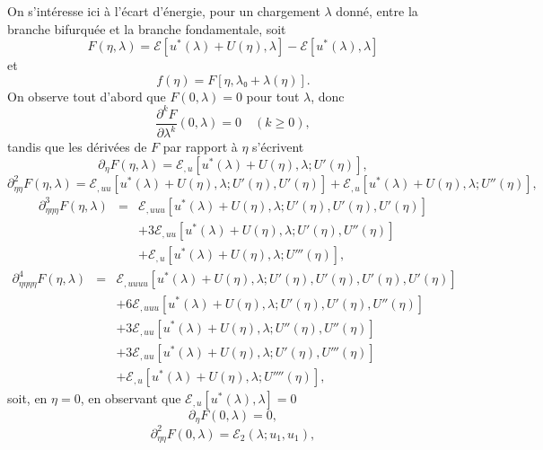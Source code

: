 \documentclass{article}
\begin{document}
On s'intéresse ici à l'écart d'énergie, pour un chargement
$λ$ donné, entre la branche bifurquée et la branche
fondamentale, soit
\begin{equation} F (η, λ) =ℰ [u^{\ast} (λ) + U (η), λ]
   -ℰ [u^{\ast} (λ), λ] \end{equation}
et
\begin{equation} f (η) = F [η, λ₀ + λ (η)] . \end{equation}
On observe tout d'abord que $F (0, λ) = 0$ pour tout $λ$, donc
\begin{equation} \frac{\partial^k F}{\partial λ^k} (0, λ) = 0 \quad (k \geq 0),
\end{equation}
tandis que les dérivées de $F$ par rapport à $η$ s'écrivent
\begin{equation} \partial_{η} F (η, λ) =ℰ_{, u} [u^{\ast} (λ) +
   U (η), λ ; U' (η)], \end{equation}
\begin{equation} \partial_{η  η}^2 F (η, λ) =ℰ_{, u
    u} [u^{\ast} (λ) + U (η), λ ; U' (η), U' (η)]
   +ℰ_{, u} [u^{\ast} (λ) + U (η), λ ; U'' (η)],
\end{equation}
\begin{eqnarray*}
  \partial_{η  η  η}^3 F (η, λ) & = &
  ℰ_{, u  u  u} [u^{\ast} (λ) + U (η),
  λ ; U' (η), U' (η), U' (η)]\\
  &  &    + 3ℰ_{, u  u}
  [u^{\ast} (λ) + U (η), λ ; U' (η), U'' (η)]\\
  &  &    +ℰ_{, u} [u^{\ast} (λ) +
  U (η), λ ; U''' (η)],
\end{eqnarray*}
\begin{eqnarray}
  \partial_{η  η  η  η}^4 F (η,
  λ) & = & ℰ_{, u  u  u  u} [u^{\ast}
  (λ) + U (η), λ ; U' (η), U' (η), U' (η), U' (η)]
  \nonumber\\
  &  &  + 6ℰ_{, u  u  u} [u^{\ast}
  (λ) + U (η), λ ; U' (η), U' (η), U'' (η)]
  \nonumber\\
  &  &  + 3ℰ_{, u  u} [u^{\ast} (λ) + U
  (η), λ ; U'' (η), U'' (η)] \nonumber\\
  &  &  + 3ℰ_{, u  u} [u^{\ast} (λ) + U
  (η), λ ; U' (η), U''' (η)] \nonumber\\
  &  &  +ℰ_{, u} [u^{\ast} (λ) + U (η), λ ;
  U'''' (η)], \nonumber
\end{eqnarray}
soit, en $η = 0$, en observant que $ℰ_{, u} [u^{\ast} (λ),
λ] = 0$
\begin{equation} \partial_{η} F (0, λ) = 0, \end{equation}
\begin{equation} \partial_{η  η}^2 F (0, λ) =ℰ_2 (λ ;
   u_1, u_1), \end{equation}
\end{document}
